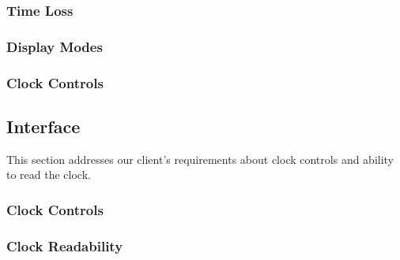\documentclass[10pt,draftclsnofoot,onecolumn]{IEEEtran}
\begin{document}
\subsubsection{Time Loss}

\subsubsection{Display Modes}

\subsubsection{Clock Controls}

\subsection{Interface}
This section addresses our client's requirements about clock controls and ability to read the clock.

\subsubsection{Clock Controls}

\subsubsection{Clock Readability}
\end{document}
